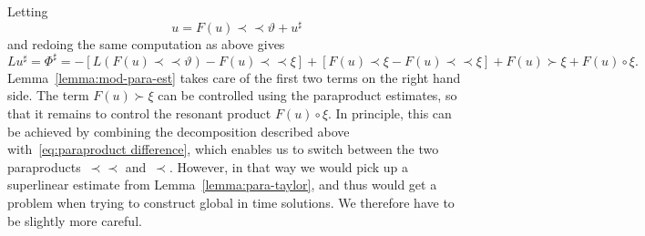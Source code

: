 \documentclass[11pt,a4paper]{article}
\newcommand{\mathD}{\mathrm{D}}
\newcommand{\precprec}{\prec\!\!\!\prec}
\theoremstyle{remark}
\newcommand{\CC}{\ensuremath{\mathscr{C}}}
\begin{document}
Letting
\begin{equation}\label{eq:mod-paracontrolled}
  u=F ( u ) \precprec \vartheta +u^{\sharp}
\end{equation}
and redoing the same computation as above gives
\begin{equation}\label{eq:phi sharp def pam}
   L u^{\sharp} = \Phi^{\sharp} = - [ L (F ( u )  \precprec \vartheta) - F(u) \precprec \xi]  + [ F ( u ) \prec \xi -F ( u ) \precprec \xi ] + F ( u ) \succ \xi + F(u) \circ \xi. %
\end{equation}
Lemma~\ref{lemma:mod-para-est} takes care of the first two terms on the right hand side. The term $F(u) \succ \xi$ can be controlled using the paraproduct estimates, so that it remains to control the resonant product $F(u) \circ \xi$. In principle, this can be achieved by combining the decomposition described above with~\eqref{eq:paraproduct difference}, which enables us to switch between the two paraproducts~$\precprec$ and~$\prec$. However, in that way we would pick up a superlinear estimate from Lemma~\ref{lemma:para-taylor}, and thus would get a problem when trying to construct global in time solutions. We therefore have to be slightly more careful.
\end{document}
